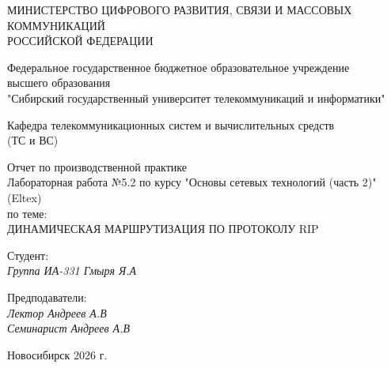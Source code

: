 \thispagestyle{empty}

\begin{center}
    МИНИСТЕРСТВО ЦИФРОВОГО РАЗВИТИЯ, СВЯЗИ И МАССОВЫХ КОММУНИКАЦИЙ \\ РОССИЙСКОЙ ФЕДЕРАЦИИ

    \vspace{20pt}

    Федеральное государственное бюджетное образовательное учреждение  \\  высшего образования \\
    "Сибирский государственный университет телекоммуникаций и информатики" \\

    \vspace{20pt}

    Кафедра телекоммуникационных систем и вычислительных средств \\  (ТС и ВС)
\end{center}

\vfill

\begin{center}
    Отчет по производственной практике \\  
    Лабораторная работа №5.2 по курсу "Основы сетевых технологий (часть 2)" (Eltex) \\
    \vspace{20pt}
    по теме: \\
    \uppercase{Динамическая маршрутизация по протоколу RIP}
\end{center}

\vfill

    \noindent Студент: \\
    \textit{Группа ИА-331 \hfill Гмыря Я.А} 

    \vspace{20pt}
 
    \noindent Предподаватели: \\
    \textit{Лектор \hfill Андреев А.В} \\
    \textit{Семинарист \hfill Андреев А.В}

\vfill

\begin{center}
    Новосибирск 2026 г.
\end{center}